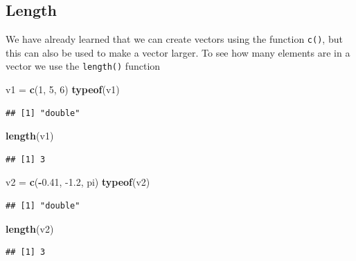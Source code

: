 \documentclass[
]{book}
\newenvironment{Shaded}{\begin{snugshade}}{\end{snugshade}}
\newcommand{\DecValTok}[1]{\textcolor[rgb]{0.00,0.00,0.81}{#1}}
\newcommand{\FloatTok}[1]{\textcolor[rgb]{0.00,0.00,0.81}{#1}}
\newcommand{\KeywordTok}[1]{\textcolor[rgb]{0.13,0.29,0.53}{\textbf{#1}}}
\newcommand{\NormalTok}[1]{#1}
\newcommand{\OperatorTok}[1]{\textcolor[rgb]{0.81,0.36,0.00}{\textbf{#1}}}
\newcommand{\StringTok}[1]{\textcolor[rgb]{0.31,0.60,0.02}{#1}}
\begin{document}
\hypertarget{length}{%
\subsection{Length}\label{length}}

We have already learned that we can create vectors using the function \texttt{c()}, but this can also be used to make a vector larger. To see how many elements are in a vector we use the \texttt{length()} function

\begin{Shaded}
\begin{Highlighting}[]
\NormalTok{v1 =}\StringTok{ }\KeywordTok{c}\NormalTok{(}\DecValTok{1}\NormalTok{, }\DecValTok{5}\NormalTok{, }\DecValTok{6}\NormalTok{)}
\KeywordTok{typeof}\NormalTok{(v1)}
\end{Highlighting}
\end{Shaded}

\begin{verbatim}
## [1] "double"
\end{verbatim}

\begin{Shaded}
\begin{Highlighting}[]
\KeywordTok{length}\NormalTok{(v1)}
\end{Highlighting}
\end{Shaded}

\begin{verbatim}
## [1] 3
\end{verbatim}

\begin{Shaded}
\begin{Highlighting}[]
\NormalTok{v2 =}\StringTok{ }\KeywordTok{c}\NormalTok{(}\OperatorTok{-}\FloatTok{0.41}\NormalTok{, }\FloatTok{-1.2}\NormalTok{, pi)}
\KeywordTok{typeof}\NormalTok{(v2)}
\end{Highlighting}
\end{Shaded}

\begin{verbatim}
## [1] "double"
\end{verbatim}

\begin{Shaded}
\begin{Highlighting}[]
\KeywordTok{length}\NormalTok{(v2)}
\end{Highlighting}
\end{Shaded}

\begin{verbatim}
## [1] 3
\end{verbatim}
\end{document}
